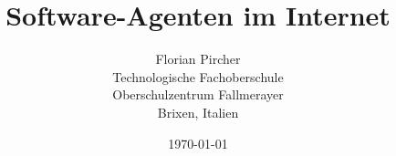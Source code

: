 \title{Software-Agenten im Internet}
\author{
  Florian Pircher\\
  Technologische Fachoberschule\\
  Oberschulzentrum Fallmerayer\\
  Brixen, Italien
}
\date{\today}
\maketitle